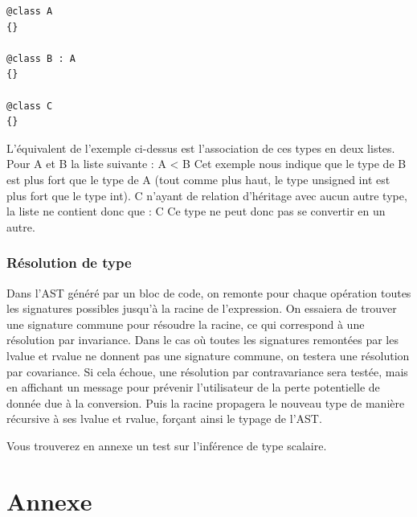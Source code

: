 \documentclass[12pt,a4paper]{article}
\begin{document}
\begin{NoHyper}
\begin{lstlisting}
@class A
{}

@class B : A
{}

@class C
{}
\end{lstlisting}
L’équivalent de l’exemple ci-dessus est l’association de ces types en deux listes.
Pour A et B la liste suivante : A < B\newline
Cet exemple nous indique que le type de B est plus fort que le type de A (tout comme plus haut, le type unsigned int est plus fort que le type int).\newline
C n’ayant de relation d’héritage avec aucun autre type, la liste ne contient donc que : C\newline
Ce type ne peut donc pas se convertir en un autre.\newline
\newline

\subsubsection{Résolution de type}
Dans l'AST généré par un bloc de code, on remonte pour chaque opération toutes les signatures possibles jusqu'à la racine de l'expression. On essaiera de trouver une signature commune pour résoudre la racine, ce qui correspond à une résolution par invariance. Dans le cas où toutes les signatures remontées par les lvalue et rvalue ne donnent pas une signature commune, on testera une résolution par covariance. Si cela échoue, une résolution par contravariance sera testée, mais en affichant un message pour prévenir l'utilisateur de la perte potentielle de donnée due à la conversion. Puis la racine propagera le nouveau type de manière récursive à ses lvalue et rvalue, forçant ainsi le typage de l'AST.



Vous trouverez en annexe un test sur l'inférence de type scalaire.


\section{Annexe}

\end{NoHyper}
\end{document}
